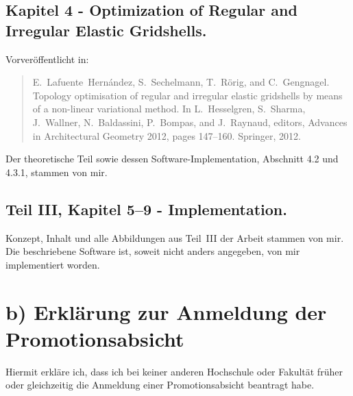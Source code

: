 \documentclass[11pt]{article}
\begin{document}
\subsection*{Kapitel 4 - Optimization of Regular and Irregular Elastic Gridshells.}
Vorveröffentlicht in:
\begin{quote}
E.~Lafuente~Hernández, S.~Sechelmann, T.~Rörig, and C.~Gengnagel. Topology optimisation of regular and irregular elastic gridshells by means of a non-linear variational method. In L.~Hesselgren, S.~Sharma, J.~Wallner, N.~Baldassini, P.~Bompas, and J.~Raynaud, editors, Advances in Architectural Geometry 2012, pages 147–160. Springer, 2012.
\end{quote}
Der theoretische Teil sowie dessen Software-Implementation, Abschnitt 4.2 und 4.3.1, stammen von mir. 

\subsection*{Teil III, Kapitel 5--9 - Implementation.}
Konzept, Inhalt und alle Abbildungen aus Teil~III der Arbeit stammen von mir. Die beschriebene Software ist, soweit nicht anders angegeben, von mir implementiert worden.

\section*{b) Erklärung zur Anmeldung der Promotionsabsicht}
Hiermit erkläre ich, dass ich bei keiner anderen Hochschule oder Fakultät früher oder gleichzeitig die Anmeldung einer Promotionsabsicht beantragt habe.
\end{document}
